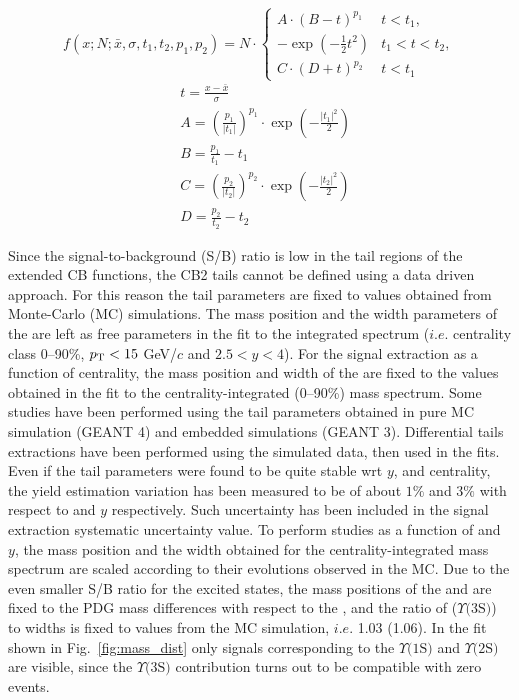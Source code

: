 \begin{equation}\label{eqn:CB2}
f(x;N;\bar{x},\sigma,t_1,t_2,p_1,p_2) = N\cdot\begin{cases} A\cdot(B-t)^{p_1} & t<t_1,\\ -\exp\left(-\frac{1}{2}t^2\right) & t_1<t<t_2,\\C\cdot(D+t)^{p_2} & t<t_1\end{cases}
\end{equation}
\begin{equation}\label{eqn:CB2def}
\begin{aligned}
&t=\frac{x-\bar{x}}{\sigma}
\\&A=\left(\frac{p_1}{|t_1|}\right)^{p_1}\cdot\exp\left(-\frac{|t_1|^2}{2}\right)
\\&B=\frac{p_1}{t_1} - t_1
\\&C=\left(\frac{p_2}{|t_2|}\right)^{p_2}\cdot\exp\left(-\frac{|t_2|^2}{2}\right)
\\&D=\frac{p_2}{t_2} - t_2
\end{aligned}
\end{equation}

Since the signal-to-background (S/B) ratio is low in the tail regions of the extended CB functions, the CB2 tails cannot be defined using a data driven approach.
For this reason the tail parameters are fixed to values obtained from Monte-Carlo (MC) simulations. 
The mass position and the width parameters of the \upsis are left as free parameters in the fit to the integrated spectrum ($i.e.$ centrality class 0--90\%, $p_{\rm T}<15$ GeV/$c$ and $2.5 < y < 4$).
For the signal extraction as a function of centrality, the mass position  and width of the \upsis are fixed to the values obtained in the fit to the centrality-integrated (0--90\%) mass spectrum.
Some studies have been performed using the tail parameters obtained in pure MC simulation (GEANT 4) and embedded simulations (GEANT 3).
Differential tails extractions have been performed using the simulated data, then used in the fits.
Even if the tail parameters were found to be quite stable wrt $y$, \pt and centrality, the yield estimation variation has been measured to be of about $1\%$ and $3\%$ with respect to \pt and $y$ respectively.
Such uncertainty has been included in the signal extraction systematic uncertainty value.
To perform studies as a function of \pt and $y$, the mass position and the width obtained for the centrality-integrated mass spectrum are scaled according to their evolutions observed in the MC.
Due to the even smaller S/B ratio for the excited states, the mass positions of the \upsiss and \upsisss are fixed to the PDG \cite{Patrignani:2016xqp} mass differences with respect to the \upsis, and the ratio of \upsiss ($\Upsilon\text{(3S)}$) to \upsis widths is fixed to values from the MC simulation, $i.e.$ 1.03 (1.06). 
In the fit shown in Fig.~\ref{fig:mass_dist} only signals corresponding to the $\Upsilon\text{(1S)}$ and $\Upsilon\text{(2S)}$ are visible, since the $\Upsilon\text{(3S)}$ contribution turns out to be compatible with zero events.
 
